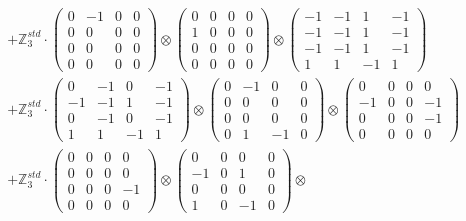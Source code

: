 \documentclass{article}
\begin{document}
{\begin{align}
        &+ \label{Rs16-Rc11-Solution-10-c22} \mathbb{Z}_3^{std} \cdot 
            \begin{pmatrix} 0 & -1 & 0 & 0 \\ 0 & 0 & 0 & 0 \\ 0 & 0 & 0 & 0 \\ 0 & 0 & 0 & 0 \end{pmatrix} \otimes 
            \begin{pmatrix} 0 & 0 & 0 & 0 \\ 1 & 0 & 0 & 0 \\ 0 & 0 & 0 & 0 \\ 0 & 0 & 0 & 0 \end{pmatrix} \otimes 
            \begin{pmatrix} -1 & -1 & 1 & -1 \\ -1 & -1 & 1 & -1 \\ -1 & -1 & 1 & -1 \\ 1 & 1 & -1 & 1 \end{pmatrix} \\ 
        &+ \label{Rs16-Rc11-Solution-10-c23} \mathbb{Z}_3^{std} \cdot 
            \begin{pmatrix} 0 & -1 & 0 & -1 \\ -1 & -1 & 1 & -1 \\ 0 & -1 & 0 & -1 \\ 1 & 1 & -1 & 1 \end{pmatrix} \otimes 
            \begin{pmatrix} 0 & -1 & 0 & 0 \\ 0 & 0 & 0 & 0 \\ 0 & 0 & 0 & 0 \\ 0 & 1 & -1 & 0 \end{pmatrix} \otimes 
            \begin{pmatrix} 0 & 0 & 0 & 0 \\ -1 & 0 & 0 & -1 \\ 0 & 0 & 0 & -1 \\ 0 & 0 & 0 & 0 \end{pmatrix} \\ 
        &+ \label{Rs16-Rc11-Solution-10-c24} \mathbb{Z}_3^{std} \cdot 
            \begin{pmatrix} 0 & 0 & 0 & 0 \\ 0 & 0 & 0 & 0 \\ 0 & 0 & 0 & -1 \\ 0 & 0 & 0 & 0 \end{pmatrix} \otimes 
            \begin{pmatrix} 0 & 0 & 0 & 0 \\ -1 & 0 & 1 & 0 \\ 0 & 0 & 0 & 0 \\ 1 & 0 & -1 & 0 \end{pmatrix} \otimes 

\end{align}}
\end{document}
